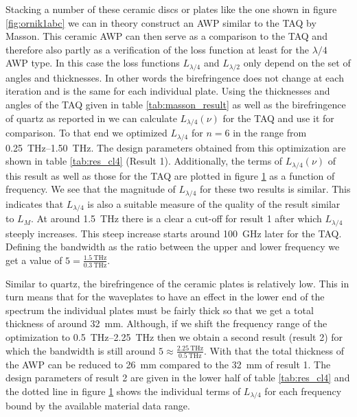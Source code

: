 Stacking a number of these ceramic discs or plates like the one shown in figure \ref{fig:ornik1abc} we can in theory construct an AWP similar to the TAQ by Masson. This ceramic AWP can then serve as a comparison to the TAQ and therefore also partly as a verification of the loss function at least for the $\lambda/4$ AWP type. In this case the loss functions $L_{\lambda/4}$ and $L_{\lambda/2}$ only depend on the set of angles and thicknesses. In other words the birefringence does not change at each iteration and is the same for each individual plate. Using the thicknesses and angles of the TAQ given in table \ref{tab:masson_result} as well as the birefringence of quartz as reported in \cite{DGrischkowsky1990} we can calculate $L_{\lambda/4}(\nu)$ for the TAQ and use it for comparison. To that end we optimized $L_{\lambda/4}$ for $n=6$ in the range from \SIrange{0.25}{1.50}{\tera \hertz}. The design parameters obtained from this optimization are shown in table \ref{tab:res_cl4} (Result 1). Additionally, the terms of $L_{\lambda/4}(\nu)$ of this result as well as those for the TAQ are plotted in figure \ref{fig:loss_function_cl4} as a function of frequency. We see that the magnitude of $L_{\lambda/4}$ for these two results is similar. This indicates that $L_{\lambda/4}$ is also a suitable measure of the quality of the result similar to $L_{M}$. At around \SI{1.5}{\tera \hertz} there is a clear a cut-off for result 1 after which $L_{\lambda/4}$ steeply increases. This steep increase starts around \SI{100}{\giga \hertz} later for the TAQ. Defining the bandwidth as the ratio between the upper and lower frequency we get a value of  $5=\frac{\SI{1.5}{\tera \hertz}}{\SI{0.3}{\tera \hertz}}$. 

\begin{table}[h]
    \centering
    
    \caption{}
    \label{tab:res_cl4}
\end{table}

\begin{figure}[h]
    \centering
    
    \caption{}
    \label{fig:loss_function_cl4}
\end{figure}

Similar to quartz, the birefringence of the ceramic plates is relatively low. This in turn means that for the waveplates to have an effect in the lower end of the spectrum the individual plates must be fairly thick so that we get a total thickness of around \SI{32}{\milli \meter}. Although, if we shift the frequency range of the optimization to \SIrange[range-phrase=-, range-units=single]{0.5}{2.25}{\tera \hertz} then we obtain a second result (result 2) for which the bandwidth is still around $5\approx\frac{\SI{2.25}{\tera \hertz}}{\SI{0.5}{\tera \hertz}}$. With that the total thickness of the AWP can be reduced to \SI{26}{\milli \meter} compared to the \SI{32}{\milli \meter} of result 1. The design parameters of result 2 are given in the lower half of table \ref{tab:res_cl4} and the dotted line in figure \ref{fig:loss_function_cl4} shows the individual terms of $L_{\lambda/4}$ for each frequency bound by the available material data range. 


